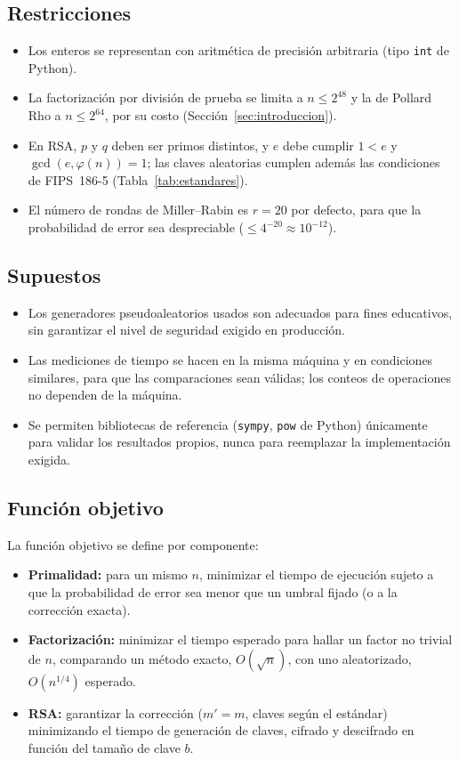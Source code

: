 \subsection{Restricciones}
\begin{itemize}
  \item Los enteros se representan con aritmética de precisión arbitraria (tipo \texttt{int} de Python).
  \item La factorización por división de prueba se limita a $n \le 2^{48}$ y la de Pollard
        Rho a $n \le 2^{64}$, por su costo (Sección~\ref{sec:introduccion}).
  \item En RSA, $p$ y $q$ deben ser primos distintos, y $e$ debe cumplir
        $1 < e$ y $\gcd(e, \varphi(n)) = 1$; las claves aleatorias cumplen además las
        condiciones de FIPS~186-5 (Tabla~\ref{tab:estandares}).
  \item El número de rondas de Miller--Rabin es $r = 20$ por defecto, para que la
        probabilidad de error sea despreciable ($\le 4^{-20} \approx 10^{-12}$).
\end{itemize}

\subsection{Supuestos}
\begin{itemize}
  \item Los generadores pseudoaleatorios usados son adecuados para fines educativos, sin
        garantizar el nivel de seguridad exigido en producción.
  \item Las mediciones de tiempo se hacen en la misma máquina y en condiciones similares, para
        que las comparaciones sean válidas; los conteos de operaciones no dependen de la máquina.
  \item Se permiten bibliotecas de referencia (\texttt{sympy}, \texttt{pow} de Python) únicamente
        para validar los resultados propios, nunca para reemplazar la implementación exigida.
\end{itemize}

\subsection{Función objetivo}

La función objetivo se define por componente:
\begin{itemize}
  \item \textbf{Primalidad:} para un mismo $n$, minimizar el tiempo de ejecución sujeto a que la
        probabilidad de error sea menor que un umbral fijado (o a la corrección exacta).
  \item \textbf{Factorización:} minimizar el tiempo esperado para hallar un factor no trivial de
        $n$, comparando un método exacto, $O(\sqrt n)$, con uno aleatorizado, $O(n^{1/4})$ esperado.
  \item \textbf{RSA:} garantizar la corrección ($m' = m$, claves según el estándar) minimizando el
        tiempo de generación de claves, cifrado y descifrado en función del tamaño de clave $b$.
\end{itemize}

